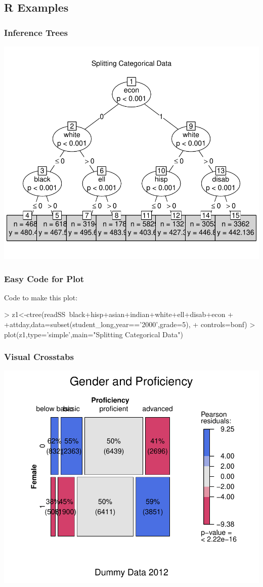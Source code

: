 \documentclass[12pt,handout]{beamer}
\begin{document}
\subsection{R Examples}
\label{sec: rexamp}

\begin{frame}
\frametitle{Inference Trees}
\begin{center}
\vspace{-.1in}
\includegraphics[width=.8\textwidth]{classtree}
\end{center}
\end{frame}

\begin{frame}[containsverbatim]
\frametitle{Easy Code for Plot}
Code to make this plot:
\vspace{.1in}
\begin{Schunk}
\begin{Sinput}
> z1<-ctree(readSS~black+hisp+asian+indian+white+ell+disab+econ
+           +attday,data=subset(student_long,year=='2000',grade=5),
+           controls=bonf)
> plot(z1,type='simple',main="Splitting Categorical Data")
\end{Sinput}
\end{Schunk}
\end{frame}


\begin{frame}
\frametitle{Visual Crosstabs}
\vspace{.1in}
\includegraphics[width=.85\textwidth]{crosstab2}
\end{frame}
\end{document}
